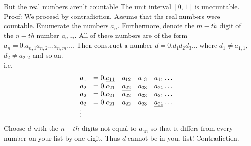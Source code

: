 \documentclass{beamer}
\begin{document}
\begin{frame}{But the real numbers aren't countable}
The unit interval $[0, 1]$ is uncountable. \\
Proof:
We proceed by contradiction. Assume that the real numbers were countable.
Enumerate the numbers $a_n$. Furthermore, denote the $m-th$ digit of the $n-th$ number $a_{n, m}.$
All of these numbers are of the form $a_n = 0.a_{n, 1} a_{n, 2} \ldots a_{n, m} \ldots$.
Then construct a number $d = 0.d_1 d_2 d_3 \ldots$ where $d_1 \ne a_{1, 1}$, $d_2 \ne a_{2, 2}$ and
so on.\\
i.e.
\begin{equation*}
\begin{array}{llllll}
a_{1} &= 0.\emph{a_{11}} &a_{12} &a_{13} &a_{14} \ldots \\
a_{2} &= 0.a_{21} &\emph{a_{22}} &a_{23} &a_{24} \ldots \\
a_{2} &= 0.a_{21} &a_{22} &\emph{a_{23}} &a_{24} \ldots \\
a_{2} &= 0.a_{21} &a_{22} &a_{23} &\emph{a_{24}} \ldots \\
\vdots
\end{array}
\end{equation*}
Choose $d$ with the $n-th$ digits not equal to $a_{n n}$ so that it differs from every number on your
list by one digit. Thus $d$ cannot be in your list! Contradiction.
\end{frame}

\end{document}
